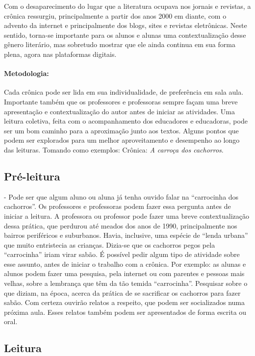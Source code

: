 \documentclass{article}
\begin{document}
Com o desaparecimento do lugar que a literatura ocupava nos jornais e
revistas, a crônica ressurgiu, principalmente a partir dos anos 2000 em
diante, com o advento da internet e principalmente dos blogs, sites e
revistas eletrônicas. Neste sentido, torna-se importante para os alunos
e alunas uma contextualização desse gênero literário, mas sobretudo
mostrar que ele ainda continua em sua forma plena, agora nas plataformas
digitais.

\paragraph{Metodologia:} Cada crônica pode ser lida em sua individualidade,
de preferência em sala aula. Importante também que os professores e
professoras sempre façam uma breve apresentação e contextualização do
autor antes de iniciar as atividades. Uma leitura coletiva, feita com o
acompanhamento dos educadores e educadoras, pode ser um bom caminho para
a aproximação junto aos textos. Alguns pontos que podem ser explorados
para um melhor aproveitamento e desempenho ao longo das leituras.
Tomando como exemplos: Crônica: \textit{A carroça dos cachorros}.

\subsection{Pré-leitura}

- Pode ser que algum aluno ou aluna já tenha ouvido falar na
``carrocinha dos cachorros''. Os professores e professoras podem fazer
essa pergunta antes de iniciar a leitura. A professora ou professor pode
fazer uma breve contextualização dessa prática, que perdurou até meados
dos anos de 1990, principalmente nos bairros periféricos e suburbanos.
Havia, inclusive, uma espécie de ``lenda urbana'' que muito entristecia
as crianças. Dizia-se que os cachorros pegos pela ``carrocinha'' iriam
virar sabão. É possível pedir algum tipo de atividade sobre esse
assunto, antes de iniciar o trabalho com a crônica. Por exemplo: as
alunas e alunos podem fazer uma pesquisa, pela internet ou com parentes
e pessoas mais velhas, sobre a lembrança que têm da tão temida
``carrocinha''. Pesquisar sobre o que diziam, na época, acerca da
prática de se sacrificar os cachorros para fazer sabão. Com certeza
ouvirão relatos a respeito, que podem ser socializados numa próxima
aula. Esses relatos também podem ser apresentados de forma escrita ou
oral.

\subsection{Leitura}
\end{document}
